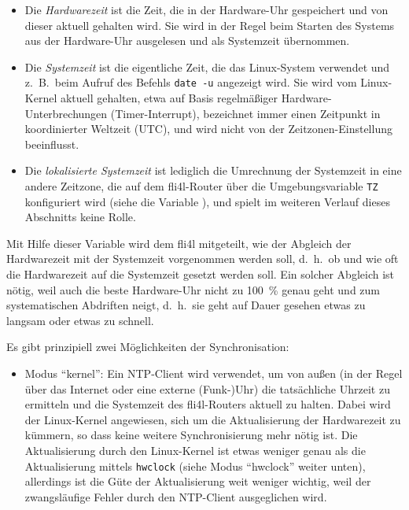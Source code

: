 \begin{description}
{  \begin{itemize}
  \item Die \emph{Hardwarezeit} ist die Zeit, die in der Hardware-Uhr
  gespeichert und von dieser aktuell gehalten wird. Sie wird in der Regel beim
  Starten des Systems aus der Hardware-Uhr ausgelesen und als Systemzeit
  übernommen.

  \item Die \emph{Systemzeit} ist die eigentliche Zeit, die das Linux-System
  verwendet und z.~B.\ beim Aufruf des Befehls \texttt{date -u} angezeigt wird.
  Sie wird vom Linux-Kernel aktuell gehalten, etwa auf Basis regelmäßiger
  Hardware-Unterbrechungen (Timer-Interrupt), bezeichnet immer einen Zeitpunkt
  in koordinierter Weltzeit (UTC), und wird nicht von der Zeitzonen-Einstellung
  beeinflusst.

  \item Die \emph{lokalisierte Systemzeit} ist lediglich die Umrechnung der
  Systemzeit in eine andere Zeitzone, die auf dem fli4l-Router über die
  Umgebungsvariable \texttt{TZ} konfiguriert wird (siehe die Variable
  ), und spielt im weiteren Verlauf dieses
  Abschnitts keine Rolle.
  \end{itemize}
   
  Mit Hilfe dieser Variable wird dem fli4l mitgeteilt, wie der Abgleich der
  Hardwarezeit mit der Systemzeit vorgenommen werden soll, d.~h.\ ob und wie
  oft die Hardwarezeit auf die Systemzeit gesetzt werden soll. Ein solcher
  Abgleich ist nötig, weil auch die beste Hardware-Uhr nicht zu 100~\% genau
  geht und zum systematischen Abdriften neigt, d.~h.\ sie geht auf Dauer
  gesehen etwas zu langsam oder etwas zu schnell.
  
  Es gibt prinzipiell zwei Möglichkeiten der Synchronisation:
  
  \begin{itemize}
  \item Modus ``kernel'': Ein NTP-Client wird verwendet, um von außen
  (in der Regel über das Internet oder eine externe (Funk-)Uhr) die tatsächliche
  Uhrzeit zu ermitteln und die Systemzeit des fli4l-Routers aktuell zu halten.
  Dabei wird der Linux-Kernel angewiesen, sich um die Aktualisierung der
  Hardwarezeit zu kümmern, so dass keine weitere Synchronisierung mehr nötig
  ist. Die Aktualisierung durch den Linux-Kernel ist etwas weniger genau als
  die Aktualisierung mittels \texttt{hwclock} (siehe Modus ``hwclock'' weiter
  unten), allerdings ist die Güte der Aktualisierung weit weniger wichtig, weil
  der zwangsläufige Fehler durch den NTP-Client ausgeglichen wird.
  

\end{itemize}}
\end{description}
